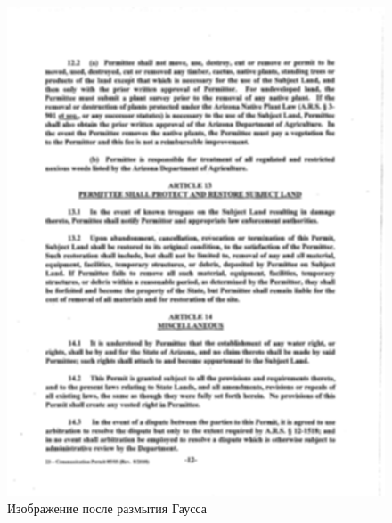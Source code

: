 \begin{figure}
    \includegraphics[scale=0.2]{img/paragraph/blur.png}
    \caption{Изображение после размытия Гаусса}
    \label{segmentation_blur}
\end{figure}

